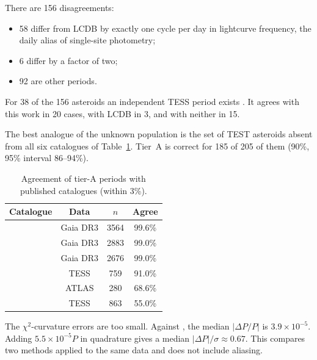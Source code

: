 There are 156 disagreements:
\begin{itemize}
\item 58 differ from LCDB by exactly one cycle per day in lightcurve frequency, the daily alias of
single-site photometry;
\item 6 differ by a factor of two;
\item 92 are other periods.
\end{itemize}
For 38 of the 156 asteroids an independent TESS period exists \citep{Vavilov2025}. It agrees with this work
in 20 cases, with LCDB in 3, and with neither in 15.

The best analogue of the unknown population is the set of TEST asteroids absent from all six catalogues of
Table~\ref{tab:lit}. Tier~A is correct for 185 of 205 of them (90\%, 95\% interval 86--94\%).

\begin{table}
\centering
\caption{Agreement of tier-A periods with published catalogues (within 3\%).}\label{tab:lit}
\begin{tabular}{lccc}
\hline
Catalogue & Data & $n$ & Agree \\
\hline
\citet{Durech2023} & Gaia DR3 & 3564 & 99.6\% \\
\citet{Cellino2024} & Gaia DR3 & 2883 & 99.0\% \\
\citet{MacLennan2026} & Gaia DR3 & 2676 & 99.0\% \\
\citet{Vavilov2025} & TESS & 759 & 91.0\% \\
\citet{Erasmus2020} & ATLAS & 280 & 68.6\% \\
\citet{McNeill2023} & TESS & 863 & 55.0\% \\
\hline
\end{tabular}

\par{}
\end{table}

The $\chi^2$-curvature errors are too small. Against \citet{Durech2023}, the median $|\Delta P/P|$ is
$3.9\times10^{-5}$. Adding $5.5\times10^{-5}P$ in quadrature gives a median $|\Delta P|/\sigma\approx0.67$.
This compares two methods applied to the same data and does not include aliasing.

